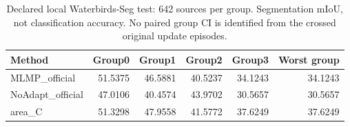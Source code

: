 \begin{table}[htbp]
\centering\scriptsize
\caption{Declared local Waterbirds-Seg test: 642 sources per group. Segmentation mIoU, not classification accuracy. No paired group CI is identified from the crossed original update episodes.}
\label{tab:bird}
\setlength{\tabcolsep}{4pt}
\begin{tabular}{lrrrrr}
\toprule
Method & Group0 & Group1 & Group2 & Group3 & Worst group \\
\midrule
MLMP\_official & 51.5375 & 46.5881 & 40.5237 & 34.1243 & 34.1243 \\
NoAdapt\_official & 47.0106 & 40.4574 & 43.9702 & 30.5657 & 30.5657 \\
area\_C & 51.3298 & 47.9558 & 41.5772 & 37.6249 & 37.6249 \\
\bottomrule
\end{tabular}
\end{table}
